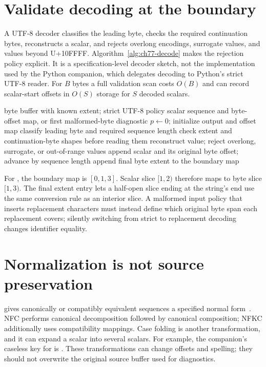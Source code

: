 \section{Validate decoding at the boundary}
\label{sec:ch77-decoding}
A UTF-8 decoder classifies the leading byte, checks the required continuation bytes, reconstructs a scalar, and rejects overlong encodings, surrogate values, and values beyond U+10FFFF.
Algorithm~\ref{alg:ch77-decode} makes the rejection policy explicit.
It is a specification-level decoder sketch, not the implementation used by the Python companion, which delegates decoding to Python's strict UTF-8 reader.
For $B$ bytes a full validation scan costs $O(B)$ and can record scalar-start offsets in $O(S)$ storage for $S$ decoded scalars.

\begin{algorithm}[htbp]
\caption{Decode bytes while recording original scalar boundaries.}
\label{alg:ch77-decode}
\begin{pseudocode}
\Require byte buffer with known extent; strict UTF-8 policy
\Ensure scalar sequence and byte-offset map, or first malformed-byte diagnostic
\State $p\gets0$; initialize output and offset map
\State classify leading byte and required sequence length
\State check extent and continuation-byte shapes before reading them
\State reconstruct value; reject overlong, surrogate, or out-of-range values
\State append scalar and its original byte offset; advance by sequence length
\EndWhile
\State append final byte extent to the boundary map
\end{pseudocode}
\end{algorithm}

For , the boundary map is $[0,1,3]$.
Scalar slice $[1,2)$ therefore maps to byte slice $[1,3)$.
The final extent entry lets a half-open slice ending at the string's end use the same conversion rule as an interior slice.
A malformed input policy that inserts replacement characters must instead define which original byte span each replacement covers; silently switching from strict to replacement decoding changes identifier equality.

\section{Normalization is not source preservation}
\label{sec:ch77-normalization}
 gives canonically or compatibly equivalent sequences a specified normal form~\cite{unicode-2026-normalization}.
NFC performs canonical decomposition followed by canonical composition; NFKC additionally uses compatibility mappings.
Case folding is another transformation, and it can expand a scalar into several scalars.
For example, the companion's caseless key for  is .
These transformations can change offsets and spelling; they should not overwrite the original source buffer used for diagnostics.

